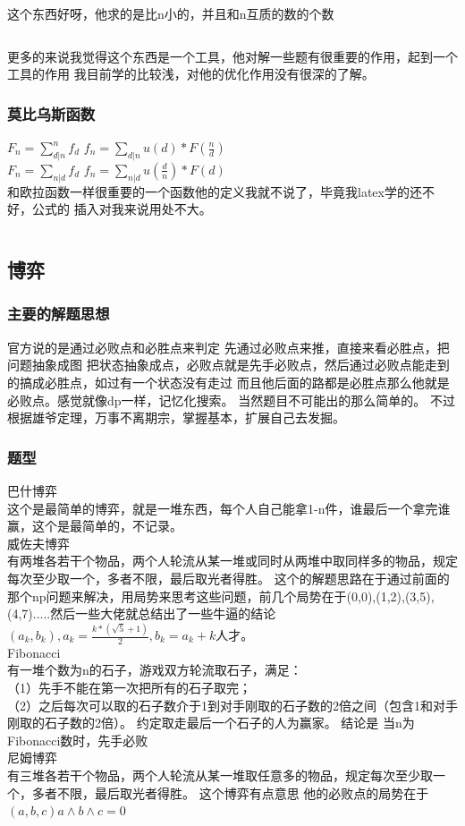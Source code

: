 \documentclass[a4paper,11pt]{article}
\begin{document}
\begin{CJK}{UTF8}{gbsn}
这个东西好呀，他求的是比n小的，并且和n互质的数的个数
\inputminted{c++}{../scoure/math/oula.cpp}
更多的来说我觉得这个东西是一个工具，他对解一些题有很重要的作用，起到一个工具的作用
我目前学的比较浅，对他的优化作用没有很深的了解。
\subsubsection{莫比乌斯函数}
$F_n = \sum_{d|n}^n f_d$
$f_n = \sum_{d|n} u(d)*F(\frac{n}{d})$\\
$F_n = \sum_{n|d} f_d$
$f_n = \sum_{n|d} u(\frac{d}{n})*F(d)$\\
和欧拉函数一样很重要的一个函数他的定义我就不说了，毕竟我latex学的还不好，公式的
插入对我来说用处不大。
\inputminted{c++}{../scoure/math/mobius.cpp}
\newpage
\subsection{博弈}
\subsubsection{主要的解题思想}
官方说的是通过必败点和必胜点来判定
先通过必败点来推，直接来看必胜点，把问题抽象成图 把状态抽象成点，必败点就是先手必败点，然后通过必败点能走到的搞成必胜点，如过有一个状态没有走过 而且他后面的路都是必胜点那么他就是必败点。感觉就像dp一样，记忆化搜索。
当然题目不可能出的那么简单的。
不过根据雄爷定理，万事不离期宗，掌握基本，扩展自己去发掘。
\subsubsection{题型}
巴什博弈\\
这个是最简单的博弈，就是一堆东西，每个人自己能拿1-n件，谁最后一个拿完谁赢，这个是最简单的，不记录。
\\威佐夫博弈\\
有两堆各若干个物品，两个人轮流从某一堆或同时从两堆中取同样多的物品，规定每次至少取一个，多者不限，最后取光者得胜。
这个的解题思路在于通过前面的那个np问题来解决，用局势来思考这些问题，前几个局势在于(0,0),(1,2),(3,5),(4,7).....然后一些大佬就总结出了一些牛逼的结论$( a_k,b_k),a_k=\frac{k*(\sqrt{5}+1)}{2} , b_k=a_k+k$人才。
\\Fibonacci\\
有一堆个数为n的石子，游戏双方轮流取石子，满足：
\\（1）先手不能在第一次把所有的石子取完；
\\（2）之后每次可以取的石子数介于1到对手刚取的石子数的2倍之间（包含1和对手刚取的石子数的2倍）。 约定取走最后一个石子的人为赢家。
结论是 当n为Fibonacci数时，先手必败
\\尼姆博弈\\
有三堆各若干个物品，两个人轮流从某一堆取任意多的物品，规定每次至少取一个，多者不限，最后取光者得胜。
这个博弈有点意思 他的必败点的局势在于$(a,b,c) a \land {b \land c} = 0$

\end{CJK}
\end{document}
